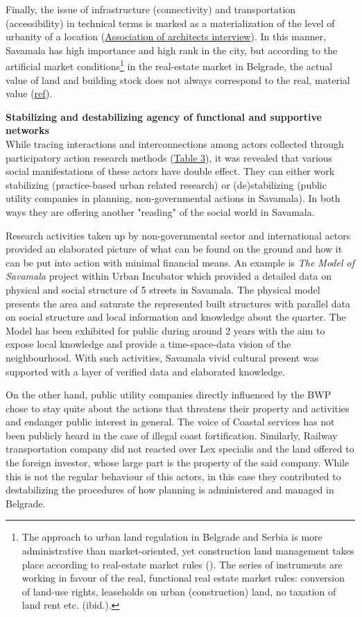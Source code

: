 \documentclass[11pt]{report}
\begin{document}
Finally, the issue of infrastructure (connectivity) and transportation (accessibility) in technical terms is marked as a materialization of the level of urbanity of a location (\href{}{Association of architects interview}). 
In this manner, Savamala has high importance and high rank in the city, but according to the artificial market conditions\footnote{
The approach to urban land regulation in Belgrade and Serbia is more administrative than market-oriented, yet construction land management takes place according to real-estate market rules (\cite{Zekovic and Maricic, 2017 land market}). The series of instruments are working in favour of the real, functional real estate market rules: conversion of land-use rights, leaseholds on urban (construction) land, no taxation of land rent etc. (ibid.).}
in the real-estate market in Belgrade, the actual value of land and building stock does not always correspond to the real, material value (\href{}{ref}).

\textbf{Stabilizing and destabilizing agency of functional and supportive networks}
\\
While tracing interactions and interconnections among actors collected through participatory action research methods (\href{}{Table 3}), it was revealed that various social manifestations of these actors have double effect. They can either work stabilizing (practice-based urban related research) or (de)stabilizing (public utility companies in planning, non-governmental actions in Savamala).
In both ways they are offering another "reading" of the social world in Savamala.

Research activities taken up by non-governmental sector and international actors provided an elaborated picture of what can be found on the ground and how it can be put into action with minimal financial means.
An example is \textit{The Model of Savamala} project within Urban Incubator which provided a detailed data on physical and social structure of 5 streets in Savamala.
The physical model presents the area and saturate the represented built structures with parallel data on social structure and local information and knowledge about the quarter. The Model has been exhibited for public during around 2 years with the aim to expose local knowledge and provide a time-space-data vision of the neighbourhood. 
With such activities, Savamala vivid cultural present was supported with a layer of verified data and elaborated knowledge.

On the other hand, public utility companies directly influenced by the BWP chose to stay quite about the actions that threatens their property and activities and endanger public interest in general. The voice of Coastal services has not been publicly heard in the case of illegal coast fortification. Similarly, Railway transportation company did not reacted over Lex specialis and the land offered to the foreign investor, whose large part is the property of the said company.  While this is not the regular behaviour of this actors, in this case they contributed to destabilizing the procedures of how planning is administered and managed in Belgrade.
\end{document}
